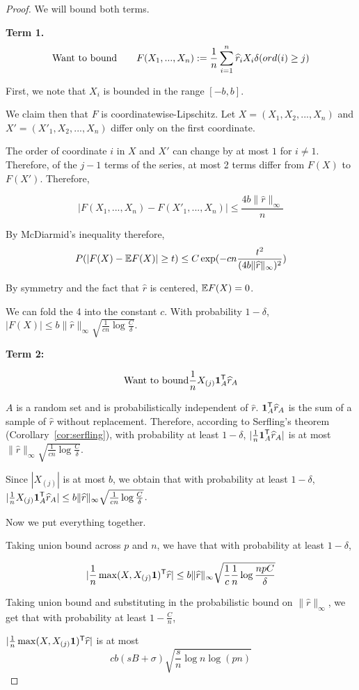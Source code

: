 \begin{proof}
We will bound both terms.

\textbf{Term 1.}
\[
\textrm{Want to bound} \qquad F(X_1,...,X_n) := \frac{1}{n}\sum_{i=1}^n \widehat{r}_i X_i \delta(ord(i) \geq j) 
\]

First, we note that $X_i$ is bounded in the range $[-b,b]$. 

We claim then that $F$ is coordinatewise-Lipschitz. Let $X = (X_1, X_2,...,X_n)$ and $X' = (X'_1, X_2, ..., X_n)$ differ only on the first coordinate. 

The order of coordinate $i$ in $X$ and $X'$ can change by at most $1$ for $i \neq 1$. Therefore, of the $j-1$ terms of the series, at most 2 terms differ from $F(X)$ to $F(X')$. Therefore,

$$ | F(X_1, ..., X_n) - F(X'_1, ..., X_n) | \leq \frac{4 b \|\hat{r}\|_\infty}{n} $$

By McDiarmid's inequality therefore, 
\[
P( | F(X) - {\mathbb E} F(X) | \geq t ) \leq C \exp( - c n\frac{t^2}{ (4 b \|\widehat{r}\|_\infty)^2})
\]

By symmetry and the fact that $\hat{r}$ is centered, ${\mathbb E} F(X) = 0$.

We can fold the 4 into the constant $c$. With probability $1-\delta$, $|F(X)| \leq b \|\hat{r}\|_\infty \sqrt{   \frac{1}{cn} \log \frac{C}{\delta}}$. 

\textbf{Term 2:}

\[
\textrm{Want to bound}   \frac{1}{n} X_{(j)} \mbox{\boldmath $1$}_A^{\mathsf{T}} \widehat{r}_A
\]

$A$ is a random set and is probabilistically independent of $\hat{r}$.  $\mbox{\boldmath $1$}_A^{\mathsf{T}} \widehat{r}_A$ is the sum of a sample of $\hat{r}$ without replacement. Therefore, according to Serfling's theorem (Corollary~\ref{cor:serfling}), with probability at least $1-\delta$, $|\frac{1}{n} \mbox{\boldmath $1$}_A^{\mathsf{T}} \widehat{r}_A|$ is at most $\| \hat{r} \|_\infty \sqrt{ \frac{1}{cn} \log \frac{C}{\delta}}$.

Since $|X_{(j)}|$ is at most $b$, we obtain that with probability at least $1-\delta$, $| \frac{1}{n} X_{(j)} \mbox{\boldmath $1$}_A^{\mathsf{T}} \widehat{r}_A| \leq b\| \widehat{r} \|_\infty \sqrt{ \frac{1}{cn} \log \frac{C}{\delta}}$.

Now we put everything together.

Taking union bound across $p$ and $n$, we have that with probability at least $1-\delta$, 

\[
| \frac{1}{n} \max(X, X_{(j)}\mbox{\boldmath $1$})^{\mathsf{T}} \widehat{r}| \leq b \|\widehat{r}\|_\infty \sqrt{ \frac{1}{c} \frac{1}{n} \log \frac{np C }{\delta}}
\]

Taking union bound and substituting in the probabilistic bound on $\|\hat{r}\|_\infty$, we get that with probability at least $1-\frac{C}{n}$,

$| \frac{1}{n} \max(X, X_{(j)}\mbox{\boldmath $1$})^{\mathsf{T}} \widehat{r}|$ is at most 
\[
 c b (sB + \sigma) \sqrt{ \frac{s}{n} \log n \log (pn) }
\]

\end{proof}

